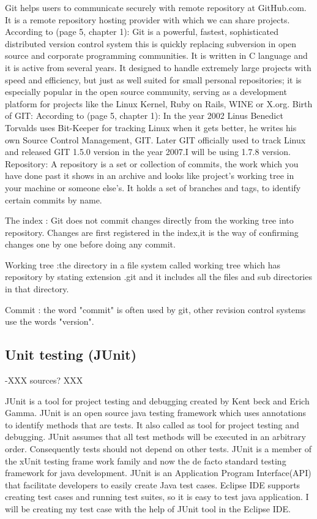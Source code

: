 \documentclass{article}
\begin{document}
Git helps users to communicate securely with remote repository at GitHub.com. It is a remote repository hosting provider with which we can share projects.	
According to \cite{Chacon2011ProGit} (page 5, chapter 1): Git is a powerful, fastest, sophisticated distributed version control system this is quickly replacing subversion in open source and corporate programming communities. It is written in C language and it is active from several years. It designed to handle extremely large projects with speed and efficiency,	but just as well suited for small personal repositories; it is especially popular in the open source community, serving as a development platform for projects like the Linux Kernel, Ruby on Rails, WINE or X.org.
Birth of GIT:
According to \cite{Chacon2011ProGit}(page 5, chapter 1): In the year 2002 Linus Benedict Torvalds uses Bit-Keeper for tracking Linux when it gets better, he writes his own Source Control Management, GIT. Later GIT officially used to track Linux and released GIT 1.5.0 version in the year 2007.I will be using 1.7.8 version.
Repository:  A repository is a set or collection of commits, the work which you have done past it shows in an archive and looks like project's working tree in your machine or someone else's. It holds a set of branches and tags, to identify certain commits by name.

The index : Git does not commit changes directly from the working tree into repository. Changes are first registered in the index,it is the way of confirming changes one by one before doing any commit.																										

Working tree :the directory in a file system called working tree which has repository by stating extension .git and it includes all the files and sub directories in that  directory.

Commit : the word "commit" is often used by git, other revision control systems use the words "version".


\subsection{Unit testing (JUnit)}
\label{sec:junit}

-XXX sources? XXX

JUnit is a tool for project testing and debugging created by Kent beck and Erich Gamma.
JUnit is an open source java testing framework which uses annotations to identify methods that are tests. It also called as tool for project testing and debugging. JUnit assumes that all test methods will be executed in an arbitrary order. Consequently tests should not depend on other tests.
JUnit is a member of the xUnit testing frame work family and now the de facto standard testing framework for java development. JUnit is an Application Program Interface(API) that facilitate developers to easily create Java test cases.
Eclipse IDE supports creating test cases and running test suites, so it is easy to test java application.
I will be creating my test case with the help of JUnit tool in the Eclipse IDE.
\end{document}
